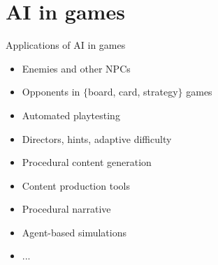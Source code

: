 \newcommand{\pictureslideb}[3]{
	\begin{frame}{#1}
		\begin{center}
			#3
			
			\vspace{6pt}
			
			\texttt{[image: \#2]}
		\end{center}
	\end{frame}
}

\newcommand{\pictureslide}[2]{
	\begin{frame}{#1}
		\begin{center}
			\texttt{[image: \#2]}
		\end{center}
	\end{frame}
}

\part{AI in games}
\frame{\partpage}


\begin{frame}{Applications of AI in games}
	\begin{itemize}
		\pause\item Enemies and other NPCs
		\pause\item Opponents in $\{$board, card, strategy$\}$ games
		\pause\item Automated playtesting
		\pause\item Directors, hints, adaptive difficulty
		\pause\item Procedural content generation
		\pause\item Content production tools
		\pause\item Procedural narrative
		\pause\item Agent-based simulations
		\pause\item ...
	\end{itemize}
\end{frame}

